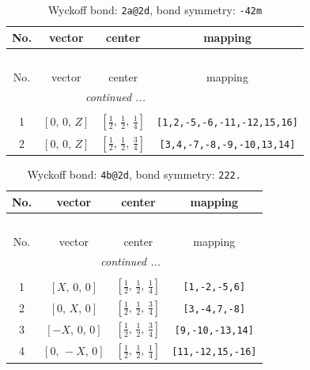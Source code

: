 \documentclass[fleqn,8pt]{jsarticle}
\begin{document}
\begin{longtable}{cccc}
\caption{Wyckoff bond: {\tt 2a@2d}, bond symmetry: {\tt -42m}}
 \\
 \hline \hline
No. & vector & center & mapping \\ \hline \endfirsthead

\multicolumn{3}{l}{\tablename\ \thetable{}} \\
 \hline \hline
No. & vector & center & mapping \\ \hline \endhead

 \hline \hline
\multicolumn{3}{r}{\footnotesize\it continued ...} \\ \endfoot

 \hline \hline
\multicolumn{3}{r}{} \\ \endlastfoot

1 & $\left[ 0,\, 0,\, Z \right]$ & $\left[ \frac{1}{2},\, \frac{1}{2},\, \frac{1}{4} \right]$ & {\tt [1,2,-5,-6,-11,-12,15,16]} \\ \hline
2 & $\left[ 0,\, 0,\, Z \right]$ & $\left[ \frac{1}{2},\, \frac{1}{2},\, \frac{3}{4} \right]$ & {\tt [3,4,-7,-8,-9,-10,13,14]} \\
\end{longtable}
\renewcommand{\arraystretch}{1.2}
\begin{longtable}{cccc}
\caption{Wyckoff bond: {\tt 4b@2d}, bond symmetry: {\tt 222.}}
 \\
 \hline \hline
No. & vector & center & mapping \\ \hline \endfirsthead

\multicolumn{3}{l}{\tablename\ \thetable{}} \\
 \hline \hline
No. & vector & center & mapping \\ \hline \endhead

 \hline \hline
\multicolumn{3}{r}{\footnotesize\it continued ...} \\ \endfoot

 \hline \hline
\multicolumn{3}{r}{} \\ \endlastfoot

1 & $\left[ X,\, 0,\, 0 \right]$ & $\left[ \frac{1}{2},\, \frac{1}{2},\, \frac{1}{4} \right]$ & {\tt [1,-2,-5,6]} \\ \hline
2 & $\left[ 0,\, X,\, 0 \right]$ & $\left[ \frac{1}{2},\, \frac{1}{2},\, \frac{3}{4} \right]$ & {\tt [3,-4,7,-8]} \\ \hline
3 & $\left[ - X,\, 0,\, 0 \right]$ & $\left[ \frac{1}{2},\, \frac{1}{2},\, \frac{3}{4} \right]$ & {\tt [9,-10,-13,14]} \\ \hline
4 & $\left[ 0,\, - X,\, 0 \right]$ & $\left[ \frac{1}{2},\, \frac{1}{2},\, \frac{1}{4} \right]$ & {\tt [11,-12,15,-16]} \\
\end{longtable}
\end{document}
